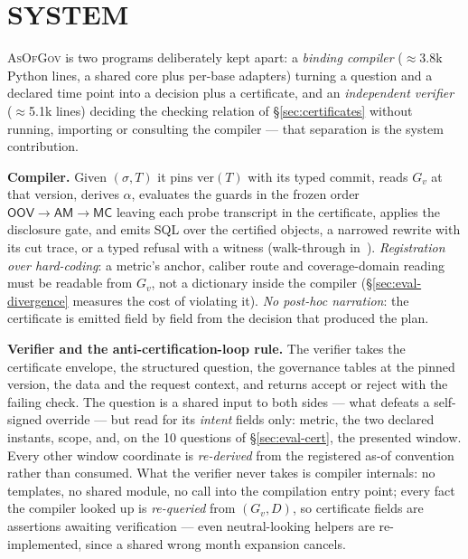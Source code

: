 \providecommand{\sysname}{\textsc{AsOfGov}}
\providecommand{\sem}[1]{[\![#1]\!]}

\section{SYSTEM}
\label{sec:system}

\sysname{} is two programs deliberately kept apart: a \emph{binding compiler}
($\approx$3.8k Python lines, a shared core plus per-base
adapters) turning a question and a declared time point into a decision
plus a certificate, and an \emph{independent verifier} ($\approx$5.1k
lines) deciding the checking relation of \S\ref{sec:certificates} without
running, importing or consulting the compiler --- that separation is the
system contribution.

\smallskip\noindent{}\textbf{Compiler.} Given $(\sigma,T)$ it pins
$\mathrm{ver}(T)$ with its typed commit, reads $G_v$ at that version, derives
$\alpha$, evaluates the guards in the frozen order
$\mathsf{OOV}\rightarrow\mathsf{AM}\rightarrow\mathsf{MC}$ leaving each probe
transcript in the certificate, applies the disclosure gate, and emits SQL over
the certified objects, a narrowed rewrite with its cut trace, or a typed refusal
with a witness (walk-through in~\cite{asofgov-tr}).
\emph{Registration over hard-coding}: a metric's anchor, caliber route and
coverage-domain reading must be readable from $G_v$, not a dictionary
inside the compiler (\S\ref{sec:eval-divergence} measures the cost of
violating it). \emph{No post-hoc narration}: the certificate is
emitted field by field from the decision that produced the plan.

\smallskip\noindent{}\textbf{Verifier and the anti-certification-loop rule.} The
verifier takes the certificate envelope, the structured question, the
governance tables at the pinned version, the data and the request context, and
returns accept or reject with the failing check. The question is a shared
input to both sides --- what defeats a self-signed override --- but read for
its \emph{intent} fields only: metric, the two declared instants, scope, and,
on the 10 questions of \S\ref{sec:eval-cert}, the presented window. Every
other window coordinate is \emph{re-derived} from the
registered as-of convention rather than consumed. What
the verifier never takes is compiler internals: no templates, no shared module,
no call into the compilation entry point; every fact the compiler looked up is
\emph{re-queried} from $(G_v,D)$, so certificate fields are assertions awaiting
verification --- even neutral-looking helpers are re-implemented, since a
shared wrong month expansion cancels.

